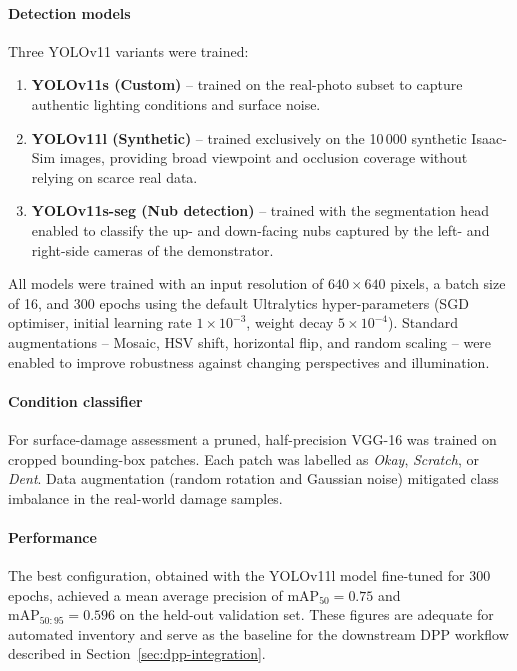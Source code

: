 \documentclass[3p,times,procedia]{elsarticle}
\begin{document}
\paragraph{Detection models}
Three YOLOv11 variants were trained:


\begin{enumerate}
    \item \textbf{YOLOv11s (Custom)} -- trained on the real-photo subset to capture authentic lighting conditions and surface noise.
    \item \textbf{YOLOv11l (Synthetic)} -- trained exclusively on the 10\,000 synthetic Isaac-Sim images, providing broad viewpoint and occlusion coverage without relying on scarce real data.
    \item \textbf{YOLOv11s-seg (Nub detection)} -- trained with the segmentation head enabled to classify the up- and down-facing nubs captured by the left- and right-side cameras of the demonstrator.
\end{enumerate}


All models were trained with an input resolution of \(640\times640\) pixels, a batch size of 16, and 300 epochs using the default Ultralytics hyper-parameters (SGD optimiser, initial learning rate \(1\times10^{-3}\), weight decay \(5\times10^{-4}\)).  
Standard augmentations -- Mosaic, HSV shift, horizontal flip, and random scaling -- were enabled to improve robustness against changing perspectives and illumination.

\paragraph{Condition classifier}
For surface-damage assessment a pruned, half-precision VGG-16 was trained on cropped bounding-box patches.  
Each patch was labelled as \textit{Okay}, \textit{Scratch}, or \textit{Dent}.  
Data augmentation (random rotation and Gaussian noise) mitigated class imbalance in the real-world damage samples.

\paragraph{Performance}
The best configuration, obtained with the YOLOv11l model fine-tuned for 300 epochs, achieved a mean average precision of \(\mathrm{mAP}_{50}=0.75\) and \(\mathrm{mAP}_{50:95}=0.596\) on the held-out validation set.  
These figures are adequate for automated inventory and serve as the baseline for the downstream DPP workflow described in Section~\ref{sec:dpp-integration}.
\end{document}
